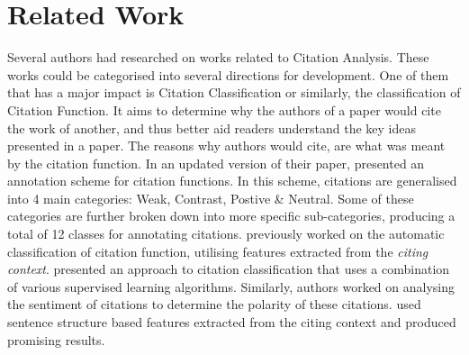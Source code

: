 \chapter{Related Work}
\label{Related Works}

Several authors had researched on works related to Citation Analysis. These works could be categorised into several directions for development. One of them that has a major impact is Citation Classification or similarly, the classification of Citation Function. It aims to determine why the authors of a paper would cite the work of another, and thus better aid readers understand the key ideas presented in a paper. The reasons why authors would cite, are what was meant by the citation function. In an updated version of their paper,  presented an annotation scheme for citation functions. In this scheme, citations are generalised into 4 main categories: Weak, Contrast, Postive \& Neutral. Some of these categories are further broken down into more specific sub-categories, producing a total of 12 classes for annotating citations. \cite{teufel2006automatic} previously worked on the automatic classification of citation function, utilising features extracted from the \textit{citing context}. \cite{dongensemble} presented an approach to citation classification that uses a combination of various supervised learning algorithms. Similarly, authors worked on analysing the sentiment of citations to determine the polarity of these citations. \cite{athar2011sentiment} used sentence structure based features extracted from the citing context and produced promising results.


